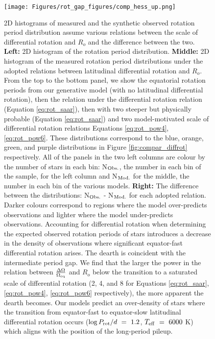 \begin{figure}
\centering
 \texttt{[image: Figures/rot\_gap\_figures/comp\_hess\_up.png]}
 \caption[2D histograms of measured and the synthetic observed rotation period distribution assuming various relations between the scale of differential rotation and $R_o$ and the difference between the two.]{
2D histograms of measured and the synthetic observed rotation period distribution assume various relations between the scale of differential rotation and $R_o$ and the difference between the two.
\textbf{Left:} 2D histogram of the \citet{mcquillan_rotation_2014} rotation period distribution.
\textbf{Middle:} 2D histogram of the measured rotation period distributions under the adopted relations between latitudinal differential rotation and $R_o$. From the top to the bottom panel, we show the equatorial rotation periods from our generative model (with no latitudinal differential rotation), then the relation under the \citet{saar_starspots_2011} differential rotation relation (Equation \ref{eq:rot_saar}), then with two steeper but physically probable (Equation \ref{eq:rot_saar}) and two model-motivated \citep{brun_powering_2022} scale of differential rotation relations Equations \ref{eq:rot_pow4}, \ref{eq:rot_pow6}.
These distributions correspond to the blue, orange, green, and purple distributions in Figure \ref{fig:compar_diffrot} respectively.
All of the panels in the two left columns are colour by the number of stars in each bin: N$_{\rm{Obs.}}$, the number in each bin of the \citet{mcquillan_rotation_2014} sample, for the left column and N$_{\rm{Mod.}}$ for the middle, the number in each bin of the various models. \textbf{Right:} The difference between the distributions: N$_{\rm{Obs.}}$ - N$_{\rm{Mod.}}$ for each adopted relation.
Darker colours correspond to regions where the model over-predicts observations and lighter where the model under-predicts observations. Accounting for differential rotation when determining the expected observed rotation periods of stars introduces a decrease in the density of observations where significant equator-fast differential rotation arises.
The dearth is coincident with the intermediate period gap. We find that the larger the power in the relation between $\frac{\Delta\Omega}{\Omega_{\rm{eq}}}$ and $R_o$ below the transition to a saturated scale of differential rotation (2, 4, and 8 for Equations \ref{eq:rot_saar}, \ref{eq:rot_pow4}, \ref{eq:rot_pow6} respectively), the more apparent the dearth becomes. Our models predict an over-density of stars where the transition from equator-fast to equator-slow latitudinal differential rotation occurs ($\log P_{\rm{rot}}/d \ = \ 1.2$, $T_{\rm{eff}} \ = \ 6000$ K) which aligns with the position of the long-period pileup.}
 \label{fig:comp_hess}
\end{figure}

